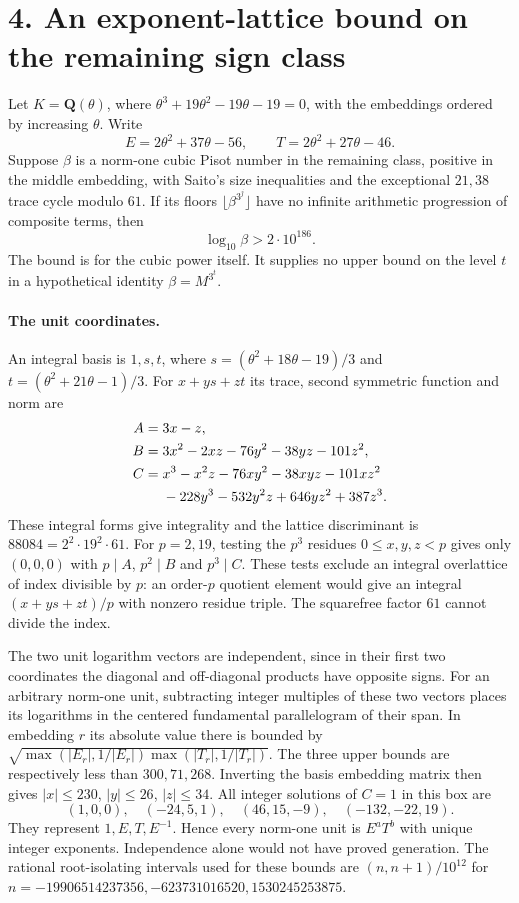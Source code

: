 \documentclass[11pt,a4paper,oneside,openany]{book}
\newcommand{\localhead}[1]{\needspace{5\baselineskip}\section*{\color{ink}#1}}
\let\sect\localhead\let\secx\localhead\let\head\localhead
\begin{document}
\sect{4. An exponent-lattice bound on the remaining sign class}
Let $K=\mathbf Q(\theta)$, where
$\theta^3+19\theta^2-19\theta-19=0$, with the embeddings ordered by
increasing $\theta$. Write
\[
 E=2\theta^2+37\theta-56,\qquad T=2\theta^2+27\theta-46.
\]
Suppose $\beta$ is a norm-one cubic Pisot number in the remaining class,
positive in the middle embedding, with Saito's size inequalities and the
exceptional $21,38$ trace cycle modulo $61$. If its floors
$\lfloor\beta^{3^j}\rfloor$ have no infinite arithmetic progression of
composite terms, then
\[
                         \log_{10}\beta>2\cdot10^{186}.
\]
The bound is for the cubic power itself. It supplies no upper bound on the
level $t$ in a hypothetical identity $\beta=M^{3^t}$.

\paragraph{The unit coordinates.}
An integral basis is $1,s,t$, where
$s=(\theta^2+18\theta-19)/3$ and $t=(\theta^2+21\theta-1)/3$.
For $x+ys+zt$ its trace, second symmetric function and norm are
\begin{align*}
 A&=3x-z,\\
 B&=3x^2-2xz-76y^2-38yz-101z^2,\\
 C&=x^3-x^2z-76xy^2-38xyz-101xz^2\\
  &\hphantom{{}={}}-228y^3-532y^2z+646yz^2+387z^3.
\end{align*}
These integral forms give integrality and the lattice discriminant is
$88084=2^2\cdot19^2\cdot61$. For $p=2,19$, testing the $p^3$ residues
$0\le x,y,z<p$ gives only $(0,0,0)$ with
$p\mid A$, $p^2\mid B$ and $p^3\mid C$. These tests exclude an integral
overlattice of index divisible by $p$: an order-$p$ quotient element would
give an integral $(x+ys+zt)/p$ with nonzero residue triple. The squarefree
factor $61$ cannot divide the index.

The two unit logarithm vectors are independent, since in their first two
coordinates the diagonal and off-diagonal products have opposite signs.
For an arbitrary norm-one unit, subtracting integer multiples of these two
vectors places its logarithms in the centered fundamental parallelogram of
their span. In embedding $r$ its absolute value there is bounded by
$\sqrt{\max(|E_r|,1/|E_r|)\max(|T_r|,1/|T_r|)}$. The three upper bounds
are respectively less than $300,71,268$. Inverting the basis embedding matrix
then gives $|x|\le230$, $|y|\le26$, $|z|\le34$. All integer solutions
of $C=1$ in this box are
\[
 (1,0,0),\quad (-24,5,1),\quad(46,15,-9),\quad(-132,-22,19).
\]
They represent $1,E,T,E^{-1}$. Hence every norm-one unit is $E^aT^b$ with
unique integer exponents. Independence alone would not have proved generation.
The rational root-isolating intervals used for these bounds are
$(n,n+1)/10^{12}$ for
$n=-19906514237356,-623731016520,1530245253875$.
\end{document}
